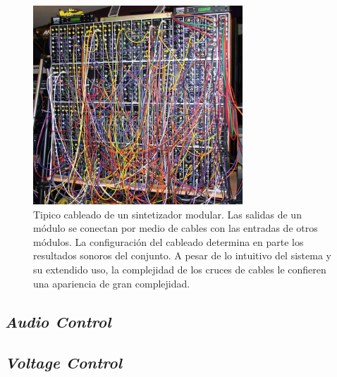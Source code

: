 \begin{figure}
	\centering
	\includegraphics[width=0.7\textwidth]{images/sinte_modular}
	\caption[Tipico cableado de un sintetizador modular]{Tipico cableado de un sintetizador modular. Las salidas de un módulo se conectan por medio de cables con las entradas de otros módulos. La configuración del cableado determina en parte los resultados sonoros del conjunto. A pesar de lo intuitivo del sistema y su extendido uso, la complejidad de los cruces de cables le confieren una apariencia de gran complejidad.}
	\label{fig:sinte_modular}
\end{figure}

\subsection{\textit{Audio Control}}


\subsection{\textit{Voltage Control}}

